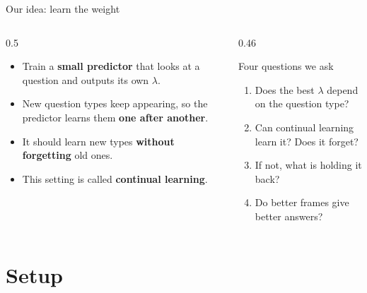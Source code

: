 \documentclass[aspectratio=169,11pt]{beamer}
\newcommand{\lam}{\lambda}
\newcommand{\strong}[1]{\textcolor{mbzuai-navy}{\textbf{#1}}}
\begin{document}
\begin{frame}{Our idea: learn the weight}
  \begin{columns}[T,onlytextwidth]
    \begin{column}{0.5\textwidth}
      \begin{itemize}
        \item Train a \strong{small predictor} that looks at a question and outputs its own $\lam$.
        \item New question types keep appearing, so the predictor learns them \strong{one after another}.
        \item It should learn new types \strong{without forgetting} old ones.
        \item This setting is called \strong{continual learning}.
      \end{itemize}
    \end{column}
    \begin{column}{0.46\textwidth}
      \begin{block}{Four questions we ask}
        \begin{enumerate}
          \item[Q1] Does the best $\lam$ depend on the question type?
          \item[Q2] Can continual learning learn it? Does it forget?
          \item[Q3] If not, what is holding it back?
          \item[Q4] Do better frames give better answers?
        \end{enumerate}
      \end{block}
    \end{column}
  \end{columns}
\end{frame}

\section{Setup}
\end{document}

